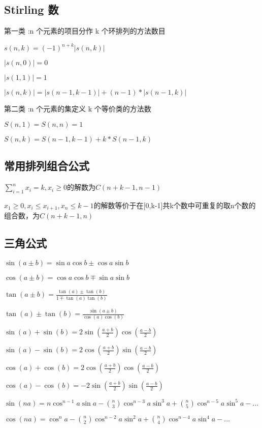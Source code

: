 \subsection{Stirling 数}
第一类 :n 个元素的项目分作 k 个环排列的方法数目\par
$s(n, k) = (-1)^{n+k}|s(n, k)|$\par
$|s(n, 0)| =0$\par
$|s(1, 1)| =1$\par
$|s(n, k)| =|s(n-1, k-1)|+(n-1)*|s(n-1, k)|$\par
第二类 :n 个元素的集定义 k 个等价类的方法数\par
$    S(n,1)=S(n,n)=1$\par
 $   S(n,k)=S(n-1,k-1)+k*S(n-1,k)$\par

\subsection{常用排列组合公式}
$\sum_{i=1}^n x_i = k, x_i \geq 0$的解数为$C(n+k-1,n-1)$\par
$x_1 \geq 0,x_i \leq x_{i+1}, x_n \leq k-1$的解数等价于在[0,k-1]共k个数中可重复的取n个数的组合数，为$C(n+k-1,n)$\par

\subsection{三角公式}
$\sin(a \pm b) = \sin a \cos b \pm \cos a \sin b$\par
$\cos(a \pm b) = \cos a \cos b \mp \sin a \sin b$\par
$\tan(a \pm b) = \frac{\tan(a)\pm\tan(b)}{1 \mp \tan(a)\tan(b)}$\par
$\tan(a) \pm \tan(b) = \frac{\sin(a \pm b)}{\cos(a)\cos(b)}$\par
$\sin(a) + \sin(b) = 2\sin(\frac{a + b}{2})\cos(\frac{a - b}{2})$\par
$\sin(a) - \sin(b) = 2\cos(\frac{a + b}{2})\sin(\frac{a - b}{2})$\par
$\cos(a) + \cos(b) = 2\cos(\frac{a + b}{2})\cos(\frac{a - b}{2})$\par
$\cos(a) - \cos(b) = -2\sin(\frac{a + b}{2})\sin(\frac{a - b}{2})$\par
$\sin(na) = n\cos^{n-1}a\sin a - \binom{n}{3}\cos^{n-3}a \sin^3a + \binom{n}{5}\cos^{n-5}a\sin^5a - \dots$\par
$\cos(na) = \cos^{n}a - \binom{n}{2}\cos^{n-2}a \sin^2a + \binom{n}{4}\cos^{n-4}a\sin^4a - \dots$\par

